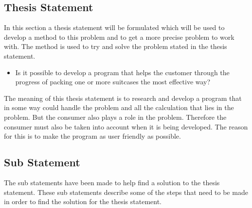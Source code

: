 \subsection{Thesis Statement}
In this section a thesis statement will be formulated which will be used to develop a method to this problem and to get a more precise problem to work with. The method is used to try and solve the problem stated in the thesis statement.

\begin{itemize}
\item Is it possible to develop a program that helps the customer through the progress of packing one or more suitcases the most effective way?
\end{itemize}


The meaning of this thesis statement is to research and develop a program that in some way could handle the problem and all the calculation that lies in the problem. But the consumer also plays a role in the problem.
Therefore the consumer must also be taken into account when it is being developed. The reason for this is to make the program as user friendly as possible.

\subsection*{Sub Statement}
The sub statements have been made to help find a solution to the thesis statement. These sub statements describe some of the steps that need to be made in order to find the solution for the thesis statement.

